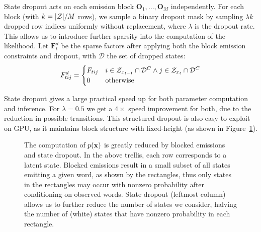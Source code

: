 \documentclass[11pt,a4paper]{article}
\begin{document}
State dropout acts on each emission block $\mathbf{O}_1, \ldots, \mathbf{O}_M$ independently.
For each block (with $k=|{\cal Z}| / M$ rows), we sample a binary dropout mask by sampling
$ \lambda k$ dropped row indices uniformly without replacement,
where $\lambda$ is the dropout rate.
This allows us to introduce further sparsity into the computation of the likelihood.
Let $\mathbf{F}_t^d$ be the sparse factors after applying both the block emission constraints
and dropout, with $\mathcal{D}$ the set of dropped states:
\begin{equation}
\label{eqn:dropout_factors}
F_{tij}^d = \begin{cases}
F_{tij} & i\in\mathcal{Z}_{x_{t-1}}\cap \mathcal{D}^C \wedge j\in\mathcal{Z}_{x_t} \cap\mathcal{D}^C\\
0 & \textrm{otherwise}
\end{cases}
\end{equation}

State dropout gives a large practical speed up for both parameter computation and inference.
For $\lambda=0.5$ we get a $4\times$ speed improvement for both,
due to the reduction in possible transitions.
This structured dropout is also easy to exploit on GPU,
as it maintains block structure with fixed-height (as shown in Figure~\ref{fig:trellis}).

\begin{figure}[!t]
\begin{center}

\end{center}
\caption{
\label{fig:trellis}
The computation of $p(\mathbf{x})$ is greatly reduced by blocked emissions and state dropout.
In the above trellis, each row corresponds to a latent state.
Blocked emissions result in a small subset of all states emitting a given word,
as shown by the rectangles, thus only states in the rectangles may occur
with nonzero probability after conditioning on observed words.
State dropout (leftmost column) allows us to further reduce the number of states we consider,
halving the number of (white) states that have nonzero probability in each rectangle.
}
\end{figure}
\end{document}
